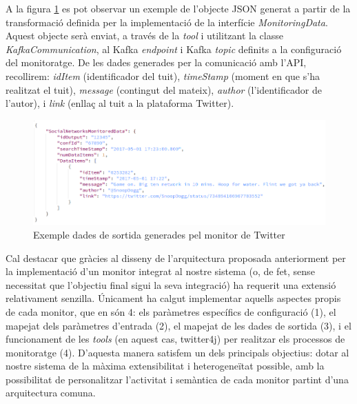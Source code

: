 A la figura \ref{fig:Figura12} es pot observar un exemple de l'objecte JSON generat a partir de la transformació definida per la implementació de la interfície \textit{MonitoringData}. Aquest objecte serà enviat, a través de la \textit{tool} i utilitzant la classe \textit{KafkaCommunication}, al Kafka \textit{endpoint} i Kafka \textit{topic} definits a la configuració del monitoratge. De les dades generades per la comunicació amb l'API, recollirem: \textit{idItem} (identificador del tuit), \textit{timeStamp} (moment en que s'ha realitzat el tuit), \textit{message} (contingut del mateix), \textit{author} (l'identificador de l'autor), i \textit{link} (enllaç al tuit a la plataforma Twitter). 

\begin{figure}[!h]
\centering
\includegraphics[width=14cm]{Figures/Figure12}
\decoRule
\caption[Exemple dades de sortida generades pel monitor de Twitter]{Exemple dades de sortida generades pel monitor de Twitter}
\label{fig:Figura12}
\end{figure}

Cal destacar que gràcies al disseny de l'arquitectura proposada anteriorment per la implementació d'un monitor integrat al nostre sistema (o, de fet, sense necessitat que l'objectiu final sigui la seva integració) ha requerit una extensió relativament senzilla. Únicament ha calgut implementar aquells aspectes propis de cada monitor, que en són 4: els paràmetres específics de configuració (1), el mapejat dels paràmetres d'entrada (2), el mapejat de les dades de sortida (3), i el funcionament de les \textit{tools} (en aquest cas, twitter4j) per realitzar els processos de monitoratge (4). D'aquesta manera satisfem un dels principals objectius: dotar al nostre sistema de la màxima extensibilitat i heterogeneïtat possible, amb la possibilitat de personalitzar l'activitat i semàntica de cada monitor partint d'una arquitectura comuna. \\

\\


